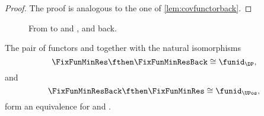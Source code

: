 \begin{proof}
The proof is analogous to the one of \cref{lem:covfunctorback}.
\end{proof}


\begin{figure}[tbh]
\centering
{}
\caption{From \DP to \UPos and \LPos, and back.}
\end{figure}



\begin{lemma}
The pair of functors \FixFunMinRes and \FixFunMinResBack together with the natural isomorphisms
\begin{equation*}
\FixFunMinRes \fthen \FixFunMinResBack \cong \funid_\DP,
\end{equation*}
and
\begin{equation*}
\FixFunMinResBack \fthen \FixFunMinRes \cong \funid_\UPos,
\end{equation*}
form an equivalence for \DP and \UPos.
\end{lemma}

